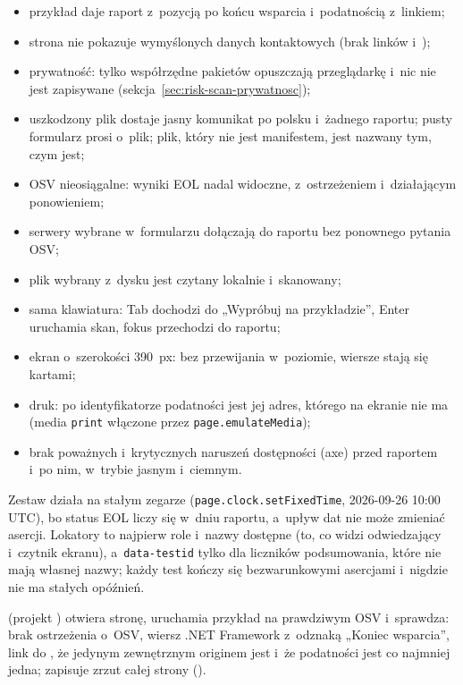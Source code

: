 \begin{itemize}
  \item przykład daje raport z~pozycją po końcu wsparcia i~podatnością z~linkiem;
  \item strona nie pokazuje wymyślonych danych kontaktowych (brak linków 
        i~);
  \item prywatność: tylko współrzędne pakietów opuszczają przeglądarkę i~nic nie jest
        zapisywane (sekcja~\ref{sec:risk-scan-prywatnosc});
  \item uszkodzony plik dostaje jasny komunikat po polsku i~żadnego raportu; pusty formularz
        prosi o~plik; plik, który nie jest manifestem, jest nazwany tym, czym jest;
  \item OSV nieosiągalne: wyniki EOL nadal widoczne, z~ostrzeżeniem i~działającym ponowieniem;
  \item serwery wybrane w~formularzu dołączają do raportu bez ponownego pytania OSV;
  \item plik wybrany z~dysku jest czytany lokalnie i~skanowany;
  \item sama klawiatura: Tab dochodzi do „Wypróbuj na przykładzie”, Enter uruchamia skan,
        fokus przechodzi do raportu;
  \item ekran o~szerokości 390~px: bez przewijania w~poziomie, wiersze stają się kartami;
  \item druk: po identyfikatorze podatności jest jej adres, którego na ekranie nie ma
        (media \texttt{print} włączone przez \texttt{page.emulateMedia});
  \item brak poważnych i~krytycznych naruszeń dostępności (axe) przed raportem i~po nim,
        w~trybie jasnym i~ciemnym.
\end{itemize}

Zestaw działa na stałym zegarze (\texttt{page.clock.setFixedTime}, 2026-09-26 10:00 UTC),
bo status EOL liczy się w~dniu raportu, a~upływ dat nie może zmieniać asercji. Lokatory to
najpierw role i~nazwy dostępne (to, co widzi odwiedzający i~czytnik ekranu),
a~\texttt{data-testid} tylko dla liczników podsumowania, które nie mają własnej nazwy; każdy
test kończy się bezwarunkowymi asercjami i~nigdzie nie ma stałych opóźnień.

 (projekt ) otwiera stronę, uruchamia przykład na
prawdziwym OSV i~sprawdza: brak ostrzeżenia o~OSV, wiersz .NET Framework z~odznaką „Koniec
wsparcia”, link  do ,
że jedynym zewnętrznym originem jest  i~że podatności jest co
najmniej jedna; zapisuje zrzut całej strony ().

